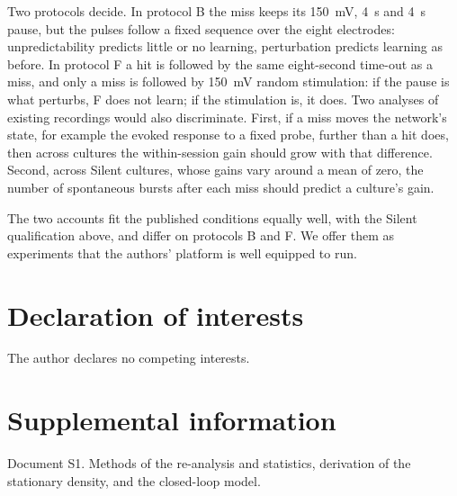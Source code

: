 \documentclass[11pt]{article}
\begin{document}
Two protocols decide. In protocol B the miss keeps its 150~mV, 4~s and 4~s pause, but the pulses follow a fixed sequence over the eight electrodes: unpredictability predicts little or no learning, perturbation predicts learning as before. In protocol F a hit is followed by the same eight-second time-out as a miss, and only a miss is followed by 150~mV random stimulation: if the pause is what perturbs, F does not learn; if the stimulation is, it does. Two analyses of existing recordings would also discriminate. First, if a miss moves the network's state, for example the evoked response to a fixed probe, further than a hit does, then across cultures the within-session gain should grow with that difference. Second, across Silent cultures, whose gains vary around a mean of zero, the number of spontaneous bursts after each miss should predict a culture's gain.

The two accounts fit the published conditions equally well, with the Silent qualification above, and differ on protocols B and F. We offer them as experiments that the authors' platform is well equipped to run.


\section*{Declaration of interests}
The author declares no competing interests.

\section*{Supplemental information}
Document S1. Methods of the re-analysis and statistics, derivation of the stationary density, and the closed-loop model.
\end{document}
